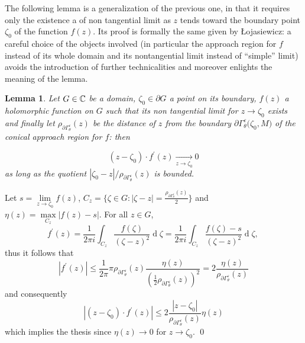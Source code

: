 \documentclass[a4paper,10pt]{article}
\newtheorem{lemma}{Lemma}
\begin{document}
The following lemma is a generalization of the previous one, in that it requires only the existence a of non tangential limit as $z$ tends toward the boundary point $\zeta_0$ of the function $f(z)$. Its proof is formally the same given by Łojasiewicz: a careful choice of the objects involved (in particular the approach region for $f$ instead of its whole domain and its nontangential limit instead of ``simple'' limit) avoids the introduction of further technicalities and moreover enlights the meaning of the lemma.

\begin{lemma}\label{lemma:main} Let $G\in\Bbb C$ be a domain, $\zeta_0 \in\partial G$ a point on its boundary, $f(z)$ a holomorphic function on $G$ such that its non tangential limit for $z \to\zeta_0$ exists and finally let $\rho_{\partial \Gamma_{\theta}^{\varepsilon}}(z)$ be the distance of $z$ from the boundary $\partial \Gamma_{\theta}^{\varepsilon}\big(\zeta_0,M\big)$ of the conical approach region for $f$: then

$$
\left(z-\zeta_0\right) \cdot f^{\prime}(z) \underset{z \to \zeta_0}{\longrightarrow} 0
$$
as long as the quotient $\left|\zeta_0-z\right| / \rho_{\partial \Gamma_{\theta}^{\varepsilon}}(z)$ is bounded.
\end{lemma}
\proof Let $s=\lim\limits_{z \to\zeta_0} f(z)$, $C_z=\bigg\{\!\zeta \in G :| \zeta-z \mid=\frac{\rho_{\partial \Gamma_{\theta}^{\varepsilon}}(z)}{2}\!\bigg\}$ and $\eta(z)=\max\limits_{C_z}|f(z) - s|$. For all $z \in G$,
$$
f^{\prime}(z)=\frac{1}{2 \pi i} \int_{C_z} \frac{f(\zeta)}{(\zeta-z)^2} \operatorname{d}\!\zeta=\frac{1}{2 \pi i} \int_{C_z}\frac{f(\zeta)-s}{(\zeta-z)^2} \operatorname{d}\! \zeta \text {, }
$$
thus it follows that
$$
\left|f^{\prime}(z)\right| \leqslant \frac{1}{2 \pi} \pi \rho_{\partial \Gamma_{\theta}^{\varepsilon}}(z) \frac{\eta(z)}{\left(\frac{1}{2} \rho_{\partial \Gamma_{\theta}^{\varepsilon}}(z)\right)^2}=2 \frac{\eta(z)}{\rho_{\partial \Gamma_{\theta}^{\varepsilon}}(z)}
$$
and consequently
$$
\left|\left(z-\zeta_0\right) \cdot f^{\prime}(z)\right| \leqslant 2 \frac{\left|z-\zeta_0\right|}{\rho_{\partial \Gamma_{\theta}^{\varepsilon}}(z)} \eta(z)
$$
which implies the thesis since $\eta(z) \to 0$ for $z \to \zeta_0$. \qed
\end{document}
